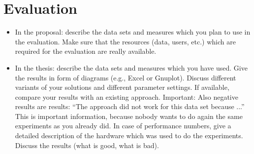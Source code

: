 \chapter{Evaluation}
\label{cha:eval}

\begin{itemize}
\item In the proposal: describe the data sets and measures which you plan
      to use in the evaluation. Make sure that the resources (data, users, etc.)
      which are required for the evaluation are really available.
\item In the thesis: describe the data sets and measures which you have used.
      Give the results in form of diagrams (e.g., Excel or Gnuplot). Discuss
      different variants of your solutions and different parameter settings.
      If available, compare your results with an existing approach. Important:
      Also negative results are results: ``The approach did not work for this
      data set because ...'' This is important information, because nobody wants
      to do again the same experiments as you already did. In case of performance
      numbers, give a detailed description of the hardware which was used to do
      the experiments. Discuss the results (what is good, what is bad).
\end{itemize}